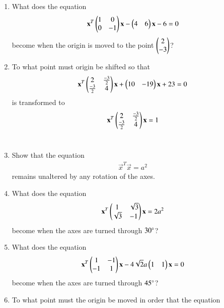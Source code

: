 \renewcommand{\theequation}{\theenumi}
\begin{enumerate}[label=\arabic*.,ref=\thesubsection.\theenumi]
\item What does the equation 
\begin{align}
\mathbf{x}^T\begin{pmatrix}1 & 0\\0 & -1\end{pmatrix}\mathbf{x}-\begin{pmatrix}4 & 6\end{pmatrix}\mathbf{x}-6=0
\end{align}
become when the origin is moved to the point $\begin{pmatrix}2\\-3\end{pmatrix}$?
\\
\solution

\item To what point must origin be shifted so that
\begin{align}\label{eq:solutions/3/4/2/eq12}
\mathbf{x}^T\begin{pmatrix}2 & \frac{-3}{2}\\\frac{-3}{2}& 4\end{pmatrix}\mathbf{x}+\begin{pmatrix} 10& -19\end{pmatrix}\mathbf{x}+23=0
\end{align}
is transformed to 
\begin{align}\label{eq:solutions/3/4/2/eq11}
\mathbf{x}^T\begin{pmatrix}2 & \frac{-3}{2}\\\frac{-3}{2}& 4\end{pmatrix}\mathbf{x}=1
\end{align}
\\
\solution

\item Show that the equation
\begin{align}
\vec{x}^T\vec{x}= a^2
\end{align}
remains unaltered by any rotation of the axes.
\item What does the equation
\begin{align}
\mathbf{x}^T\begin{pmatrix}1 & \sqrt{3}\\ \sqrt{3} & -1\end{pmatrix}\mathbf{x} = 2a^2
\label{eq:solutions/3/4/4/eq:given}
\end{align}
become when the axes are turned through $30\degree$?
\\
\solution

\item What does the equation
\begin{align}
\mathbf{x}^T\begin{pmatrix}1 & -1\\-1 & 1\end{pmatrix}\mathbf{x}-4\sqrt{2}a\begin{pmatrix}1 & 1\end{pmatrix}\mathbf{x}=0
\end{align}
become when the axes are turned through $45\degree$?
\\
\solution

\item To what point must the origin be moved in order that the equation
\begin{align}

\end{align}
\end{enumerate}
